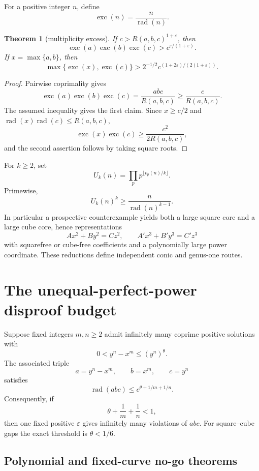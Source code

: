 \documentclass[11pt]{article}
\newtheorem{theorem}{Theorem}[section]
\theoremstyle{definition}
\theoremstyle{remark}
\begin{document}
For a positive integer $n$, define
\[
  \operatorname{exc}(n)=\frac{n}{\operatorname{rad}(n)}.
\]

\begin{theorem}[multiplicity excess]
If $c>R(a,b,c)^{1+\varepsilon}$, then
\[
 \operatorname{exc}(a)\operatorname{exc}(b)
 \operatorname{exc}(c)
 >c^{\varepsilon/(1+\varepsilon)}.
\]
If $x=\max\{a,b\}$, then
\[
 \max\{\operatorname{exc}(x),\operatorname{exc}(c)\}
 >2^{-1/2}c^{(1+2\varepsilon)/(2(1+\varepsilon))}.
\]
\end{theorem}

\begin{proof}
Pairwise coprimality gives
\[
 \operatorname{exc}(a)\operatorname{exc}(b)
 \operatorname{exc}(c)=\frac{abc}{R(a,b,c)}\ge \frac{c}{R(a,b,c)}.
\]
The assumed inequality gives the first claim.  Since $x\ge c/2$ and
$\operatorname{rad}(x)\operatorname{rad}(c)\le R(a,b,c)$,
\[
 \operatorname{exc}(x)\operatorname{exc}(c)
 \ge \frac{c^2}{2R(a,b,c)},
\]
and the second assertion follows by taking square roots.
\end{proof}

For $k\ge2$, set
\[
 U_k(n)=\prod_p p^{\lfloor v_p(n)/k\rfloor}.
\]
Primewise,
\[
 U_k(n)^k\ge \frac{n}{\operatorname{rad}(n)^{k-1}}.
\]
In particular a prospective counterexample yields both a large square core
and a large cube core, hence representations
\[
 Ax^2+By^2=Cz^2,
 \qquad
 A'x^3+B'y^3=C'z^3
\]
with squarefree or cube-free coefficients and a polynomially large power
coordinate.  These reductions define independent conic and genus-one routes.

\section{The unequal-perfect-power disproof budget}

Suppose fixed integers $m,n\ge2$ admit infinitely many coprime positive
solutions with
\[
 0<y^n-x^m\le (y^n)^\theta.
\]
The associated triple
\[
 a=y^n-x^m,\qquad b=x^m,\qquad c=y^n
\]
satisfies
\[
 \operatorname{rad}(abc)\le c^{\theta+1/m+1/n}.
\]
Consequently, if
\[
 \theta+\frac1m+\frac1n<1,
\]
then one fixed positive $\varepsilon$ gives infinitely many violations of
$abc$.  For square--cube gaps the exact threshold is $\theta<1/6$.

\subsection{Polynomial and fixed-curve no-go theorems}
\end{document}
